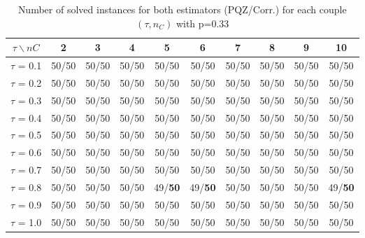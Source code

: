 \begin{table}[H]
\centering


\begin{tabular}{|c|c|c|c|c|c|c|c|c|c|}
\hline
$\tau \backslash nC$ & 2 & 3 & 4 & 5 & 6 & 7 & 8 & 9 & 10 \\
\hline
$\tau$ = 0.1 & 50/50 & 50/50 & 50/50 & 50/50 & 50/50 & 50/50 & 50/50 & 50/50 & 50/50 \\
\hline
$\tau$ = 0.2 & 50/50 & 50/50 & 50/50 & 50/50 & 50/50 & 50/50 & 50/50 & 50/50 & 50/50 \\
\hline
$\tau$ = 0.3 & 50/50 & 50/50 & 50/50 & 50/50 & 50/50 & 50/50 & 50/50 & 50/50 & 50/50 \\
\hline
$\tau$ = 0.4 & 50/50 & 50/50 & 50/50 & 50/50 & 50/50 & 50/50 & 50/50 & 50/50 & 50/50 \\
\hline
$\tau$ = 0.5 & 50/50 & 50/50 & 50/50 & 50/50 & 50/50 & 50/50 & 50/50 & 50/50 & 50/50 \\
\hline
$\tau$ = 0.6 & 50/50 & 50/50 & 50/50 & 50/50 & 50/50 & 50/50 & 50/50 & 50/50 & 50/50 \\
\hline
$\tau$ = 0.7 & 50/50 & 50/50 & 50/50 & 50/50 & 50/50 & 50/50 & 50/50 & 50/50 & 50/50 \\
\hline
$\tau$ = 0.8 & 50/50 & 50/50 & 50/50 & 49/\textbf{50} & 49/\textbf{50} & 50/50 & 50/50 & 50/50 & 49/\textbf{50} \\
\hline
$\tau$ = 0.9 & 50/50 & 50/50 & 50/50 & 50/50 & 50/50 & 50/50 & 50/50 & 50/50 & 50/50 \\
\hline
$\tau$ = 1.0 & 50/50 & 50/50 & 50/50 & 50/50 & 50/50 & 50/50 & 50/50 & 50/50 & 50/50 \\
\hline
\end{tabular}


~	\caption{Number of solved instances for both estimators (PQZ/Corr.) for each couple $(\tau, n_C)$ with p=0.33}
    \label{nbSolved033}
\end{table}


